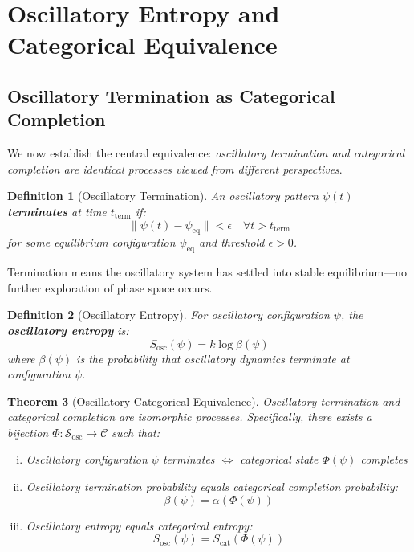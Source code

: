 \documentclass[11pt]{article}
\newtheorem{theorem}{Theorem}[section]
\newtheorem{definition}[theorem]{Definition}
\theoremstyle{remark}
\begin{document}
\section{Oscillatory Entropy and Categorical Equivalence}

\subsection{Oscillatory Termination as Categorical Completion}

We now establish the central equivalence: \textit{oscillatory termination and categorical completion are identical processes viewed from different perspectives}.

\begin{definition}[Oscillatory Termination]
\label{def:oscillatory_termination}
An oscillatory pattern $\psi(t)$ \textbf{terminates} at time $t_{\text{term}}$ if:
\begin{equation}
\|\psi(t) - \psi_{\text{eq}}\| < \epsilon \quad \forall t > t_{\text{term}}
\end{equation}
for some equilibrium configuration $\psi_{\text{eq}}$ and threshold $\epsilon > 0$.
\end{definition}

Termination means the oscillatory system has settled into stable equilibrium—no further exploration of phase space occurs.

\begin{definition}[Oscillatory Entropy]
\label{def:oscillatory_entropy}
For oscillatory configuration $\psi$, the \textbf{oscillatory entropy} is:
\begin{equation}
S_{\text{osc}}(\psi) = k \log \beta(\psi)
\label{eq:oscillatory_entropy}
\end{equation}
where $\beta(\psi)$ is the probability that oscillatory dynamics terminate at configuration $\psi$.
\end{definition}

\begin{theorem}[Oscillatory-Categorical Equivalence]
\label{thm:oscillatory_categorical_equivalence}
Oscillatory termination and categorical completion are isomorphic processes. Specifically, there exists a bijection $\Phi: \mathcal{S}_{\text{osc}} \to \mathcal{C}$ such that:
\begin{enumerate}[(i)]
\item Oscillatory configuration $\psi$ terminates $\iff$ categorical state $\Phi(\psi)$ completes
\item Oscillatory termination probability equals categorical completion probability:
\begin{equation}
\beta(\psi) = \alpha(\Phi(\psi))
\end{equation}
\item Oscillatory entropy equals categorical entropy:
\begin{equation}
S_{\text{osc}}(\psi) = S_{\text{cat}}(\Phi(\psi))
\end{equation}
\end{enumerate}
\end{theorem}
\end{document}
